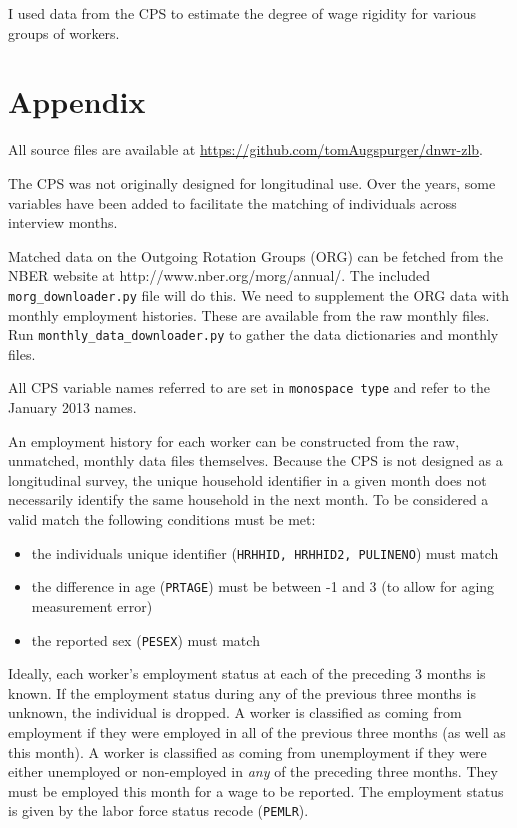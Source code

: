 \documentclass[11pt]{article}
\begin{document}
I used data from the CPS to estimate the degree of wage rigidity for various groups of workers.

\newpage



\appendix

\section{Appendix}
\label{sec:appendix}

All source files are available at \href{https://github.com/tomAugspurger/dnwr-zlb}{https://github.com/tomAugspurger/dnwr-zlb}.

The CPS was not originally designed for longitudinal use.
Over the years, some variables have been added to facilitate the matching of individuals across interview months.

Matched data on the Outgoing Rotation Groups (ORG) can be fetched from the NBER website at http://www.nber.org/morg/annual/.
The included \texttt{morg\_downloader.py} file will do this.
We need to supplement the ORG data with monthly employment histories.
These are available from the raw monthly files.
Run \texttt{monthly\_data\_downloader.py} to gather the data dictionaries and monthly files.

All CPS variable names referred to are set in \texttt{monospace type} and refer to the January 2013 names.

An employment history for each worker can be constructed from the raw, unmatched, monthly data files themselves.
Because the CPS is not designed as a longitudinal survey, the unique household identifier in a given month does not necessarily identify the same household in the next month.
To be considered a valid match the following conditions must be met:

\begin{itemize}
    \item the individuals unique identifier (\texttt{HRHHID, HRHHID2, PULINENO}) must match
    \item the difference in age (\texttt{PRTAGE}) must be between -1 and 3 (to allow for aging measurement error)
    \item the reported sex (\texttt{PESEX}) must match
\end{itemize}

Ideally, each worker's employment status at each of the preceding 3 months is known.
If the employment status during any of the previous three months is unknown, the individual is dropped.
A worker is classified as coming from employment if they were employed in all of the previous three months (as well as this month).
A worker is classified as coming from unemployment if they were either unemployed or non-employed in \emph{any} of the preceding three months.
They must be employed this month for a wage to be reported.
The employment status is given by the labor force status recode (\texttt{PEMLR}).
\end{document}
